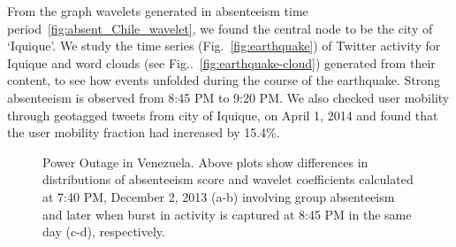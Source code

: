 \documentclass[conference]{IEEEtran}
\begin{document}
From the graph wavelets generated in absenteeism time period~\ref{fig:absent_Chile_wavelet}, we found the central node to be the city of `Iquique'.
We study the time series (Fig.~\ref{fig:earthquake}) of Twitter activity for Iquique and word clouds (see Fig..~\ref{fig:earthquake-cloud}) generated from their content, to see how events unfolded during the course of the earthquake.
Strong absenteeism is observed from 8:45 PM to 9:20 PM. We also checked  user mobility through geotagged tweets from city of Iquique, on April 1, 2014 and found that the user mobility fraction had increased by 15.4\%.

\begin{figure}[t]
	\centering
	\caption{Power Outage in Venezuela. Above plots show differences in distributions of absenteeism score and wavelet coefficients calculated at 7:40 PM, December 2, 2013 (a-b) involving group absenteeism and later when burst in activity is captured at 8:45 PM in the same day (c-d), respectively.}
\label{fig:case2_wavelet}
\end{figure}
\end{document}
